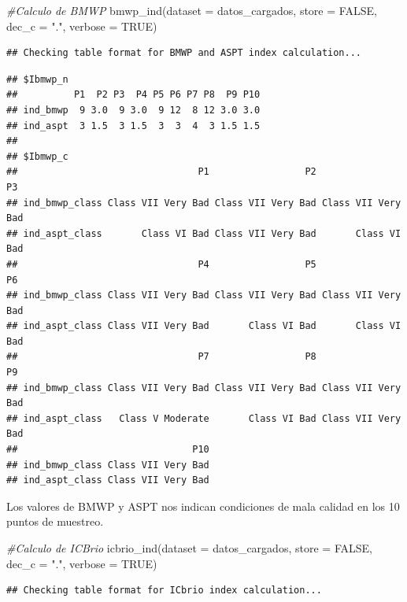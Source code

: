 \documentclass[
]{book}
\newenvironment{Shaded}{\begin{snugshade}}{\end{snugshade}}
\newcommand{\AttributeTok}[1]{\textcolor[rgb]{0.77,0.63,0.00}{#1}}
\newcommand{\CommentTok}[1]{\textcolor[rgb]{0.56,0.35,0.01}{\textit{#1}}}
\newcommand{\ConstantTok}[1]{\textcolor[rgb]{0.00,0.00,0.00}{#1}}
\newcommand{\FunctionTok}[1]{\textcolor[rgb]{0.00,0.00,0.00}{#1}}
\newcommand{\NormalTok}[1]{#1}
\newcommand{\StringTok}[1]{\textcolor[rgb]{0.31,0.60,0.02}{#1}}
\begin{document}
\begin{Shaded}
\begin{Highlighting}[]
\CommentTok{\#Calculo de BMWP}
\FunctionTok{bmwp\_ind}\NormalTok{(}\AttributeTok{dataset =}\NormalTok{ datos\_cargados, }\AttributeTok{store =} \ConstantTok{FALSE}\NormalTok{, }\AttributeTok{dec\_c =} \StringTok{"."}\NormalTok{, }\AttributeTok{verbose =} \ConstantTok{TRUE}\NormalTok{)}
\end{Highlighting}
\end{Shaded}

\begin{verbatim}
## Checking table format for BMWP and ASPT index calculation...
\end{verbatim}

\begin{verbatim}
## $Ibmwp_n
##          P1  P2 P3  P4 P5 P6 P7 P8  P9 P10
## ind_bmwp  9 3.0  9 3.0  9 12  8 12 3.0 3.0
## ind_aspt  3 1.5  3 1.5  3  3  4  3 1.5 1.5
## 
## $Ibmwp_c
##                                P1                 P2                 P3
## ind_bmwp_class Class VII Very Bad Class VII Very Bad Class VII Very Bad
## ind_aspt_class       Class VI Bad Class VII Very Bad       Class VI Bad
##                                P4                 P5                 P6
## ind_bmwp_class Class VII Very Bad Class VII Very Bad Class VII Very Bad
## ind_aspt_class Class VII Very Bad       Class VI Bad       Class VI Bad
##                                P7                 P8                 P9
## ind_bmwp_class Class VII Very Bad Class VII Very Bad Class VII Very Bad
## ind_aspt_class   Class V Moderate       Class VI Bad Class VII Very Bad
##                               P10
## ind_bmwp_class Class VII Very Bad
## ind_aspt_class Class VII Very Bad
\end{verbatim}

Los valores de BMWP y ASPT nos indican condiciones de mala calidad en los 10 puntos de muestreo.

\begin{Shaded}
\begin{Highlighting}[]
\CommentTok{\#Calculo de ICBrio}
\FunctionTok{icbrio\_ind}\NormalTok{(}\AttributeTok{dataset =}\NormalTok{ datos\_cargados, }\AttributeTok{store =} \ConstantTok{FALSE}\NormalTok{, }\AttributeTok{dec\_c =} \StringTok{"."}\NormalTok{, }\AttributeTok{verbose =} \ConstantTok{TRUE}\NormalTok{)}
\end{Highlighting}
\end{Shaded}

\begin{verbatim}
## Checking table format for ICbrio index calculation...
\end{verbatim}
\end{document}
